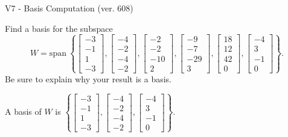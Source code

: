 \begin{exercise}
  \begin{exerciseTitle}V7 - Basis Computation (ver. 608)\end{exerciseTitle}
  \begin{exerciseStatement}
    Find a basis for the subspace 
\[W=\mathrm{span}\ \left\{\left[\begin{array}{r}
-3 \\
-1 \\
1 \\
-3
\end{array}\right] , \left[\begin{array}{r}
-4 \\
-2 \\
-4 \\
-2
\end{array}\right] , \left[\begin{array}{r}
-2 \\
-2 \\
-10 \\
2
\end{array}\right] , \left[\begin{array}{r}
-9 \\
-7 \\
-29 \\
3
\end{array}\right] , \left[\begin{array}{r}
18 \\
12 \\
42 \\
0
\end{array}\right] , \left[\begin{array}{r}
-4 \\
3 \\
-1 \\
0
\end{array}\right]\right\}.\]
 Be sure to explain why your result is a basis.


  \end{exerciseStatement}
  \begin{exerciseAnswer}
   A basis of \(W\) is  \(\left\{\left[\begin{array}{r}
-3 \\
-1 \\
1 \\
-3
\end{array}\right] , \left[\begin{array}{r}
-4 \\
-2 \\
-4 \\
-2
\end{array}\right] , \left[\begin{array}{r}
-4 \\
3 \\
-1 \\
0
\end{array}\right]\right\}\).
  


  \end{exerciseAnswer}
\end{exercise}